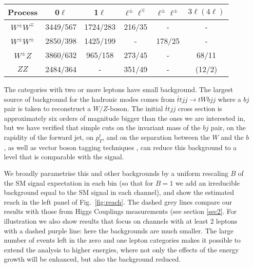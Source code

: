 \begin{center}
\begin{tabular}{|c|c|c|c|c|c|}
\hline
Process& 0$\ell$ & 1$\ell$ & $\ell^\pm\ell^\mp$ & $\ell^\pm\ell^\pm$ & $3\ell(4\ell)$\\
 \hline
 $W^\pm W^\mp$    &  3449/567 & 1724/283 & 216/35 & - & -  \\
 $W^\pm W^\pm$    &  2850/398 & 1425/199 & - & 178/25 & -  \\
 $W^\pm Z$   &  3860/632& 965/158 & 273/45 & - & 68/11 \\
 $Z Z$    &  2484/364& - & 351/49 & - &  (12/2) \\\hline
\end{tabular}
 \end{center}
 
The categories with two or more leptons have small background.
%
The largest source of background for the hadronic modes comes from $\bar t t jj\to tWbjj$ where a $bj$ pair is taken to reconstruct a $W/Z$-boson.
The initial $\bar{t}tjj$ cross section is approximately six orders of magnitude bigger than the ones we are interested in, but we have verified that simple cuts on the invariant mass of the $bj$ pair, on the rapidity of the forward jet, on $p_T^t$, and on the separation between the $W$ and the $b$, as well as vector boson tagging techniques \cite{ATLAS-CONF-2018-016}, can reduce this background to a level that is comparable with the signal.

We broadly parametrise this and other backgrounds by a uniform rescaling $B$ of the SM signal expectation in each bin (so that for $B=1$ we add an irreducible background equal to the SM signal in each channel), and show the estimated reach in the left panel of Fig.~\ref{fig:reach}. The dashed grey lines compare our results with those from Higgs Couplings  measurements (see section \ref{sec2}. For illustration we also show  results that focus on channels with at least 2 leptons with a dashed purple line: here the backgrounds are much smaller. The large number of events left in the zero and one lepton categories makes it possible to extend the analysis to higher energies, where not only the effects of the energy growth will be enhanced, but also the background reduced.






